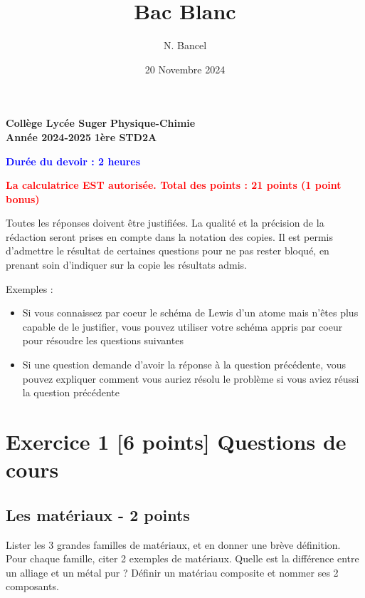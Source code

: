\documentclass{exam}
\title{Bac Blanc}
\author{N. Bancel}
\date{20 Novembre 2024}
\begin{document}
\textbf{Collège Lycée Suger}
\hfill
\textbf{Physique-Chimie} \\

\textbf{Année 2024-2025}
\hfill
\textbf{1ère STD2A} \par

{\let\newpage\relax\maketitle}


\begin{center}
  \textbf{\textcolor{blue}{Durée du devoir : 2 heures}} \par
  \vspace{1em}
  \textbf{\textcolor{red}{La calculatrice EST autorisée. Total des points : 21 points (1 point bonus)}} \par
  \vspace{1em}
\end{center}

\begin{tcolorbox}[colback=gray!10!white, colframe=gray, title=Note importante]
  \itshape{Toutes les réponses doivent être justifiées.
  La qualité et la précision de la rédaction seront prises en compte dans la notation des copies.
  Il est permis d'admettre le résultat de certaines questions pour ne pas rester bloqué, en prenant soin d'indiquer sur la copie les résultats admis. \par
  \vspace{1em}
  Exemples :
  \begin{itemize}
    \item Si vous connaissez par coeur le schéma de Lewis d'un atome mais n'êtes plus capable de le justifier, vous pouvez utiliser votre schéma appris par coeur pour résoudre les questions suivantes 
    \item Si une question demande d'avoir la réponse à la question précédente, vous pouvez expliquer comment vous auriez résolu le problème si vous aviez réussi la question précédente
  \end{itemize}
  }
\end{tcolorbox}

\section*{Exercice 1 [6 points] Questions de cours}

\subsection*{Les matériaux - 2 points}
\begin{questions}
  \question[1] Lister les 3 grandes familles de matériaux, et en donner une brève définition. Pour chaque famille, citer 2 exemples de matériaux.
  \question[0.5] Quelle est la différence entre un alliage et un métal pur ?
  \question[0.5] Définir un matériau composite et nommer ses 2 composants.

\end{questions}
\end{document}

